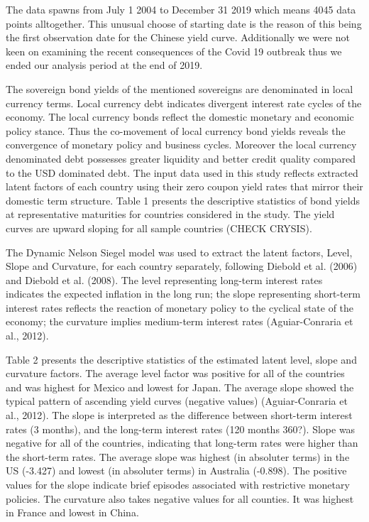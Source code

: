 \documentclass{article}
\begin{document}
The data spawns from July 1 2004 to December 31 2019 which means 4045 data points alltogether. This unusual choose of starting date is the reason of this being the first observation date for the Chinese yield curve. Additionally we were not keen on examining the recent consequences of the Covid 19 outbreak thus we ended our analysis period at the end of 2019. 

The sovereign bond yields of the mentioned sovereigns are denominated in local currency terms. Local currency debt indicates divergent interest rate cycles of the economy. The local currency bonds reflect the domestic monetary and economic policy stance. Thus the co-movement of local currency bond yields reveals the convergence of monetary policy and business cycles. Moreover the local currency denominated debt possesses greater liquidity and better credit quality compared to the USD dominated debt. The input data used in this study reflects extracted latent factors of each country using their zero coupon yield rates that mirror their domestic term structure. Table 1 presents the descriptive statistics of bond yields at representative maturities for countries considered in the study. The yield curves are upward sloping for all sample countries (CHECK CRYSIS).

The Dynamic Nelson Siegel model was used to extract the latent factors, Level, Slope and Curvature, for each country separately, following Diebold et al. (2006) and Diebold et al. (2008). The level representing long-term interest rates indicates the expected inflation in the long run; the slope representing short-term interest rates reflects the reaction of monetary policy to the cyclical state of the economy; the curvature implies medium-term interest rates (Aguiar-Conraria et al., 2012). 


\bigskip

Table 2 presents the descriptive statistics of the estimated latent level, slope and curvature factors. The average level factor was positive for all of the countries and was highest for Mexico and lowest for Japan. The average slope showed the typical pattern of ascending yield curves (negative values) (Aguiar-Conraria et al., 2012). The slope is interpreted as the difference between short-term interest rates (3 months), and the long-term interest rates (120 months 360?). Slope was negative for all of the countries, indicating that long-term rates were higher than the short-term rates. The average slope was highest (in absoluter terms) in the US (-3.427) and lowest (in absoluter terms) in Australia (-0.898). The positive values for the slope indicate brief episodes associated with restrictive monetary policies.
The curvature also takes negative values for all counties. It was highest in France and lowest in China. 
\end{document}
